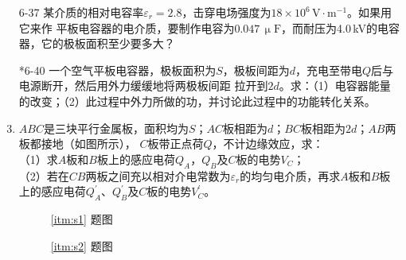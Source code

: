 \documentclass[UTF-8]{ctexart}
\begin{document}
\begin{enumerate}
    \item[6-37] 某介质的相对电容率\(\varepsilon_r=2.8\)，击穿电场强度为\(18\times 10^6\,\mathrm{V\cdot m^{-1}}\)。如果用它来作
        平板电容器的电介质，要制作电容为\(0.047\,\upmu\mathrm{F}\)，而耐压为4.0\,kV的电容器，它的极板面积至少要多大？
    
    \item[*6-40] 一个空气平板电容器，极板面积为\(S\)，极板间距为\(d\)，充电至带电\(Q\)后与电源断开，然后用外力缓缓地将两极板间距
        拉开到\(2d\)。求：（1）电容器能量的改变；（2）此过程中外力所做的功，并讨论此过程中的功能转化关系。
    
    \item \label{itm:s1} \(ABC\)是三块平行金属板，面积均为\(S\)；\(AC\)板相距为\(d\)；\(BC\)板相距为\(2d\)；\(AB\)两板都接地（如图所示），
        \(C\)板带正点荷\(Q\)，不计边缘效应，求：\\
        （1）求\(A\)板和\(B\)板上的感应电荷\(Q_A\)，\(Q_B\)及\(C\)板的电势\(V_C\)；\\
        （2）若在\(CB\)两板之间充以相对介电常数为\(\varepsilon_r\)的均匀电介质，再求\(A\)板和\(B\)板上的感应电荷\(Q_A^\prime\)、\(Q_B^\prime\)及\(C\)板的电势\(V_C^\prime\)。
        \begin{figure}[htb]
            \centering
            \begin{minipage}[b]{0.4\textwidth}
                \centering
                \caption*{\ref{itm:s1} 题图}
            \end{minipage}
            \begin{minipage}[b]{0.4\textwidth}
                \centering
                \caption*{\ref{itm:s2} 题图}
            \end{minipage}
        \end{figure}
    

\end{enumerate}
\end{document}
